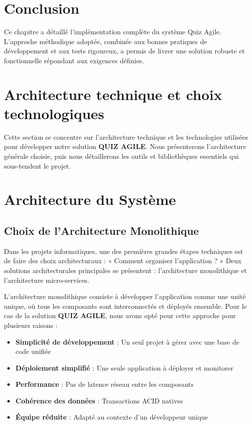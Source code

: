 \documentclass[12pt,a4paper]{report}
\begin{document}
\section{Conclusion}

Ce chapitre a détaillé l'implémentation complète du système Quiz Agile. L'approche méthodique adoptée, combinée aux bonnes pratiques de développement et aux tests rigoureux, a permis de livrer une solution robuste et fonctionnelle répondant aux exigences définies.

\section{Architecture technique et choix technologiques}

Cette section se concentre sur l'architecture technique et les technologies utilisées pour développer notre solution \textbf{QUIZ AGILE}. Nous présenterons l'architecture générale choisie, puis nous détaillerons les outils et bibliothèques essentiels qui sous-tendent le projet.

\section{Architecture du Système}

\subsection{Choix de l'Architecture Monolithique}

Dans les projets informatiques, une des premières grandes étapes techniques est de faire des choix architecturaux : « Comment organiser l'application ? » Deux solutions architecturales principales se présentent : l'architecture monolithique et l'architecture micro-services.

L'architecture monolithique consiste à développer l'application comme une unité unique, où tous les composants sont interconnectés et déployés ensemble. Pour le cas de la solution \textbf{QUIZ AGILE}, nous avons opté pour cette approche pour plusieurs raisons :

\begin{itemize}
\item \textbf{Simplicité de développement} : Un seul projet à gérer avec une base de code unifiée
\item \textbf{Déploiement simplifié} : Une seule application à déployer et monitorer
\item \textbf{Performance} : Pas de latence réseau entre les composants
\item \textbf{Cohérence des données} : Transactions ACID natives
\item \textbf{Équipe réduite} : Adapté au contexte d'un développeur unique
\end{itemize}
\end{document}
